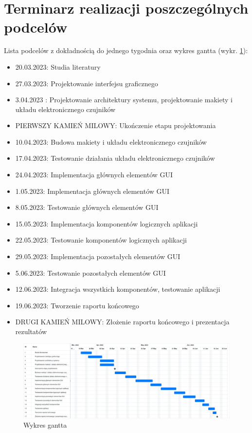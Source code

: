 \section{Terminarz realizacji poszczególnych podcelów}
    Lista podcelów z dokładnością do jednego tygodnia oraz wykres gantta (wykr. \ref{fig: gantt}):
\begin{itemize}
    \item 
        20.03.2023: Studia literatury 
    \item 
        27.03.2023: Projektowanie interfejsu graficznego
    \item 
        3.04.2023 : Projektowanie architektury systemu, projektowanie makiety i układu elektronicznego czujników
        \item PIERWSZY KAMIEŃ MILOWY: Ukończenie etapu projektowania
    \item 
        10.04.2023: Budowa makiety i układu elektronicznego czujników
    \item 
        17.04.2023: Testowanie działania układu elektronicznego czujników
    \item 
        24.04.2023: Implementacja głównych elementów GUI
    \item 
        1.05.2023: Implementacja głównych elementów GUI
    \item 
        8.05.2023: Testowanie głównych elementów GUI
    \item 
        15.05.2023: Implementacja komponentów logicznych aplikacji
    \item 
        22.05.2023: Testowanie komponentów logicznych aplikacji
    \item 
        29.05.2023: Implementacja pozostałych elementów GUI
    \item 
        5.06.2023: Testowanie pozostałych elementów GUI
    \item 
        12.06.2023: Integracja wszystkich komponentów, testowanie aplikacji
    \item 
        19.06.2023: Tworzenie raportu końcowego
    \item DRUGI KAMIEŃ MILOWY:  Złożenie raportu końcowego i prezentacja rezultatów
\end{itemize}

\begin{figure}[H]
    \centering
    \includegraphics[width = \textheight, angle = 270]{obrazy/wsd_gantt.png}
    \caption{Wykres gantta}
    \label{fig: gantt}
\end{figure}
